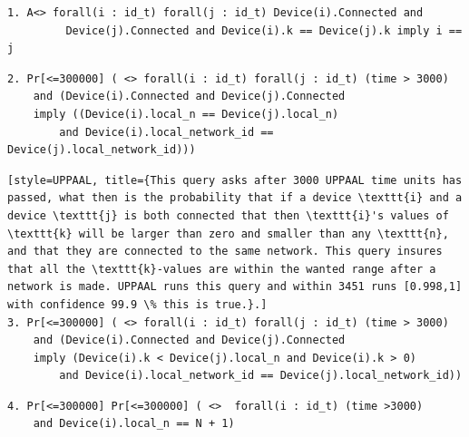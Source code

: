 \begin{lstlisting}[style=UPPAAL, title={This query requires that eventually if all devices are connected, then no pair of devices have the same \texttt{k}, unless the pair consists of the same two devices. This is true.}]
1. A<> forall(i : id_t) forall(j : id_t) Device(i).Connected and
         Device(j).Connected and Device(i).k == Device(j).k imply i == j
\end{lstlisting}

\begin{lstlisting}[style=UPPAAL, title={This query asks after 3000 UPPAAL time units has passed, what then is the probability that if two devices \texttt{i}, and \texttt{j} are connected to a network that their local values of \texttt{n} are the same, and that they are both connected to the same network. This means that the devices are connected to the same network. UPPAAL runs this query and within 3451 runs [0.998,1] with confidence 99.9 \% this is true. }]
2. Pr[<=300000] ( <> forall(i : id_t) forall(j : id_t) (time > 3000) 
    and (Device(i).Connected and Device(j).Connected 
    imply ((Device(i).local_n == Device(j).local_n)
        and Device(i).local_network_id == Device(j).local_network_id)))     
\end{lstlisting}

\begin{lstlisting}[style=UPPAAL, title={This query asks after 3000 UPPAAL time units has passed, what then is the probability that if a device \texttt{i} and a device \texttt{j} is both connected that then \texttt{i}'s values of \texttt{k} will be larger than zero and smaller than any \texttt{n}, and that they are connected to the same network. This query insures that all the \texttt{k}-values are within the wanted range after a network is made. UPPAAL runs this query and within 3451 runs [0.998,1] with confidence 99.9 \% this is true.}.]
3. Pr[<=300000] ( <> forall(i : id_t) forall(j : id_t) (time > 3000) 
    and (Device(i).Connected and Device(j).Connected 
    imply (Device(i).k < Device(j).local_n and Device(i).k > 0) 
        and Device(i).local_network_id == Device(j).local_network_id))

\end{lstlisting}

\begin{lstlisting}[style=UPPAAL, title={This query asks after 3000 UPPAAL time units has passed, what then is the probability that a device \texttt{i} has a local value of \texttt{n} to be equal to the number of devices plus the the empty slot, which is \texttt{N} + 1, which means that all devices are in the same network. UPPAAL runs this query and within 3451 runs [0.998,1] with confidence 99.9 \% this is true.}]
4. Pr[<=300000] Pr[<=300000] ( <>  forall(i : id_t) (time >3000) 
    and Device(i).local_n == N + 1)
\end{lstlisting}

